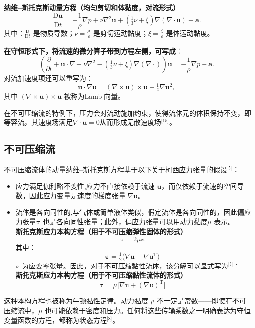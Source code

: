 \textbf{纳维–斯托克斯动量方程（均匀剪切和体黏度，对流形式）}
$$
\frac{\mathrm{D}\mathbf{u}}{\mathrm{D}t}
= -\frac{1}{\rho}\nabla p
+ \nu \nabla^2 \mathbf{u}
+ \left(\tfrac{1}{3}\nu + \xi \right)\nabla (\nabla \cdot \mathbf{u})
+ \mathbf{a}.~
$$
其中：$\displaystyle \frac{\mathrm{D}}{\mathrm{D}t}$ 是物质导数；$\nu = \frac{\mu}{\rho}$ 是剪切运动黏度；$\xi = \frac{\zeta}{\rho}$ 是体运动黏度。

\textbf{在守恒形式下，将流速的微分算子带到方程左侧，可写成：}
$$
\left(
\frac{\partial}{\partial t}
+ \mathbf{u} \cdot \nabla
- \nu \nabla^2
- \left(\tfrac{1}{3}\nu + \xi\right)\nabla(\nabla \cdot)
\right)\mathbf{u}
= -\frac{1}{\rho}\nabla p
+ \mathbf{a}.~
$$
对流加速度项还可以重写为：
$$
\mathbf{u} \cdot \nabla \mathbf{u}
= (\nabla \times \mathbf{u}) \times \mathbf{u}
+ \tfrac{1}{2}\nabla \mathbf{u}^2,~
$$
其中 $(\nabla \times \mathbf{u}) \times \mathbf{u}$ 被称为Lamb 向量。

在不可压缩流的特例下，压力会对流动施加约束，使得流体元的体积保持不变，即等容流，其速度场满足$\nabla \cdot \mathbf{u} = 0$从而形成无散速度场\(^\text{[15]}\)。
\subsection{不可压缩流}
不可压缩流体的动量纳维–斯托克斯方程基于以下关于柯西应力张量的假设\(^\text{[5]}\)：

\begin{itemize}
\item 应力满足伽利略不变性,应力不直接依赖于流速 $\mathbf{u}$，而仅依赖于流速的空间导数，因此应力变量是速度的梯度张量 $\nabla \mathbf{u}$。
\item 流体是各向同性的,与气体或简单液体类似，假定流体是各向同性的，因此偏应力张量$\boldsymbol{\tau}$ 也是各向同性张量；此外，偏应力张量可以用动力黏度$\mu$ 表示。\\
\textbf{斯托克斯应力本构方程（用于不可压缩弹性固体的形式）}
$$
\boldsymbol{\tau} = 2\mu \boldsymbol{\varepsilon}~
$$
其中：
$$
\boldsymbol{\varepsilon} = \tfrac{1}{2} \big(\nabla \mathbf{u} + \nabla \mathbf{u}^{\mathrm{T}}\big)~
$$
$\boldsymbol{\varepsilon}$ 为应变率张量。因此，对于不可压缩黏性流体，该分解可以显式写为\(^\text{[5]}\)：\\
\textbf{斯托克斯应力本构方程（用于不可压缩黏性流体的形式）}
$$
\boldsymbol{\tau} = \mu
\big[\nabla \mathbf{u} + (\nabla \mathbf{u})^{\mathrm{T}}\big]~
$$
\end{itemize}
这种本构方程也被称为牛顿黏性定律。动力黏度 $\mu$ 不一定是常数——即使在不可压缩流中，$\mu$ 也可能依赖于密度和压力。任何将这些传输系数之一明确表达为守恒变量函数的方程，都称为状态方程\(^\text{[8]}\)。

